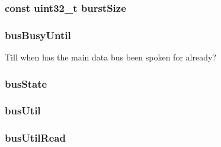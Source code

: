 \hypertarget{classDRAMCtrl_aed1f7024fc9eeb4654afe54d86683d76}{
\subsubsection[{burstSize}]{\setlength{\rightskip}{0pt plus 5cm}const {\bf uint32\_\-t} {\bf burstSize}}}
\label{classDRAMCtrl_aed1f7024fc9eeb4654afe54d86683d76}
\hypertarget{classDRAMCtrl_a0a423ce73b4c78a0da7ce4ad9e60add6}{
\subsubsection[{busBusyUntil}]{ {\bf busBusyUntil}}}
\label{classDRAMCtrl_a0a423ce73b4c78a0da7ce4ad9e60add6}
Till when has the main data bus been spoken for already? \hypertarget{classDRAMCtrl_a898cc5ed4c5a9ec9c13dbe52d1ea0eb2}{
\subsubsection[{busState}]{ {\bf busState}}}
\label{classDRAMCtrl_a898cc5ed4c5a9ec9c13dbe52d1ea0eb2}
\hypertarget{classDRAMCtrl_a32757323249e0ec2fd96e77d543fc60d}{
\subsubsection[{busUtil}]{ {\bf busUtil}}}
\label{classDRAMCtrl_a32757323249e0ec2fd96e77d543fc60d}
\hypertarget{classDRAMCtrl_a578cf14141a41ca0c302331cf1641d4a}{
\subsubsection[{busUtilRead}]{ {\bf busUtilRead}}}

